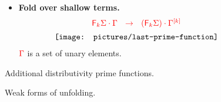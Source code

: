 \begin{figure}
{\begin{minipage}{1\linewidth}
\begin{itemize}
$$\begin{array}{c}
 {\texttt{[image: pictures/shallow-fold-distrib]}} 
\end{array}
$$
\item \textbf{Fold over shallow terms.} 
$$
\begin{array}{c}
 {\color{red}{{\color{red}{\mathsf F_{k}}}\Sigma\cdot \Gamma\ \ \to \ \ ({\color{red}{\mathsf F_{k}}}\Sigma) \cdot \Gamma^{{\color{red}{[k]}}}}}\\[5pt]
 {\texttt{[image: pictures/last-prime-function]}} 
\end{array}
$$
${\color{red}{\Gamma}}$ is a set of unary elements.
\end{itemize}
\end{minipage}
}
\caption{Additional distributivity prime functions.} \label{fig:additional-distrib-prime}
\end{figure}

\begin{figure}
\caption{Weak forms of unfolding.}\label{fig:weak-unfolding}
\end{figure}